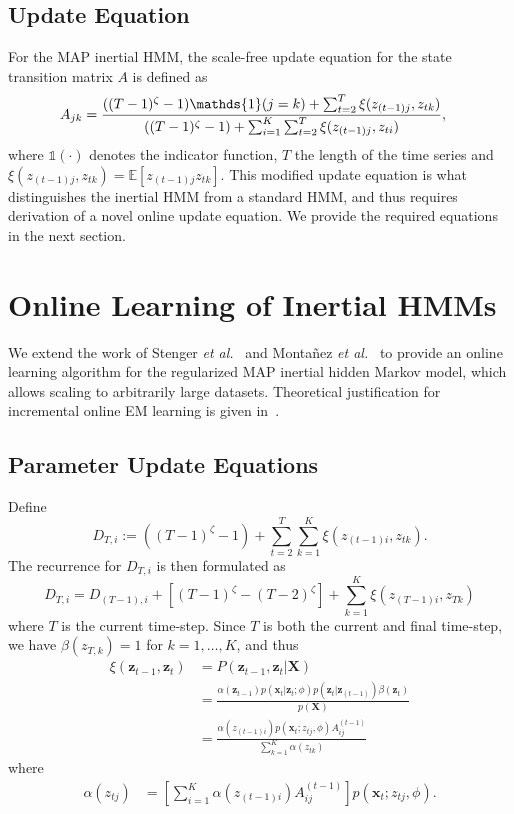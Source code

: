 \documentclass{article}
\begin{document}
\subsection{Update Equation}

For the MAP inertial HMM, the scale-free update equation for the state transition matrix $A$ is defined as
\begin{align}\label{eq:SCALE-FREE-MAP}
  \setlength{\abovedisplayskip}{0pt}
  \setlength{\belowdisplayskip}{0pt}
    A_{jk} &= \frac{((T - 1)^{\zeta}-1){\mathds{1}(j = k)} + \sum_{t=2}^{T} \xi(z_{(t-1)j}, z_{tk})}   
    {((T - 1)^{\zeta} - 1) + \sum_{i=1}^{K}\sum_{t=2}^{T} \xi(z_{(t-1)j}, z_{ti})},
\end{align}
where $\mathds{1}(\cdot)$ denotes the indicator function, $T$ the length of the time series and $\xi(z_{(t-1)j}, z_{tk})=\mathds{E}[z_{(t-1)j}z_{tk}]$. This modified update equation is what distinguishes the inertial HMM from a standard HMM, and thus requires derivation of a novel online update equation. We provide the required equations in the next section.

\section{Online Learning of Inertial HMMs}

We extend the work of Stenger \emph{et
al.}~ and Monta\~nez \emph{et
al.}~ to provide an online learning algorithm for the
regularized MAP inertial hidden Markov model, which allows scaling to arbitrarily large
datasets. Theoretical justification for incremental online EM learning is given
in~\cite{Neal:1999:VEA:308574.308679}.

\subsection{Parameter Update Equations}

Define 
\[
   D_{T,i} := ((T-1)^\zeta -1) + \sum_{t=2}^{T}\sum_{k=1}^{K} \xi(z_{(t-1)i}, z_{tk}).
\]
The recurrence for $D_{T,i}$ is then formulated as
\begin{equation*}
    D_{T,i} = D_{(T-1), i} + [(T-1)^\zeta - (T-2)^\zeta] + \sum_{k=1}^{K}
    \xi(z_{(T-1)i}, z_{Tk})
\end{equation*}
where $T$ is the current time-step. Since $T$ is both the current and final time-step, we have $\beta(z_{T,k}) = 1$ for $k = 1, \ldots, K$, and thus
\begin{align*}
    \xi(\mathbf{z}_{t-1}, \mathbf{z}_{t}) 
            &= P(\mathbf{z}_{t-1}, \mathbf{z}_{t} | \mathbf{X}) \\
            &= \frac{\alpha(\mathbf{z}_{t-1})p(\mathbf{x}_t|\mathbf{z}_t; \phi)p(\mathbf{z}_{t}|\mathbf{z}_{(t-1)})\beta(\mathbf{z}_t)}{p(\mathbf{X})} \\
            &= \frac{\alpha(z_{(t-1)i})p(\mathbf{x}_t; z_{tj}, \phi)A_{ij}^{(t-1)}}{\sum_{k=1}^{K}\alpha(z_{tk})}
\end{align*}
where
\begin{align*}
    \alpha(z_{tj}) &= \left[\sum_{i=1}^{K} \alpha(z_{(t-1)i})A_{ij}^{(t-1)}\right]p(\mathbf{x}_t; z_{tj},\phi).
\end{align*}
\end{document}

